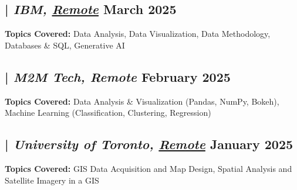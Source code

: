 \subsection{ | \textit{IBM, \href{https://www.coursera.org/account/accomplishments/specialization/S03A5IS9AEA7}{Remote}} \hfill	March 2025}
\begin{zitemize}
\item \textbf{Topics Covered:} Data Analysis, Data Visualization, Data Methodology, Databases \& SQL, Generative AI
\end{zitemize}

\subsection{ | \textit{M2M Tech, Remote} \hfill	February 2025}
\begin{zitemize}
\item \textbf{Topics Covered:} Data Analysis \& Visualization (Pandas, NumPy, Bokeh), Machine Learning (Classification, Clustering, Regression)
\end{zitemize}

\subsection{ | \textit{University of Toronto, \href{https://www.coursera.org/account/accomplishments/specialization/certificate/UALI76ER4OPO}{Remote}} \hfill	January 2025}
\begin{zitemize}
\item \textbf{Topics Covered:} GIS Data Acquisition and Map Design, Spatial Analysis and Satellite Imagery in a GIS
\end{zitemize}